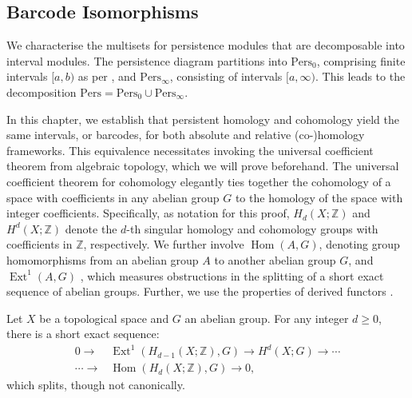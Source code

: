 \subsection{Barcode Isomorphisms}
\label{BarcodeIsomorphisms}
We characterise the multisets for persistence modules that are decomposable into
interval modules. The persistence diagram partitions into $\mathrm{Pers}_{0}$,
comprising finite intervals $[a, b)$ as per \cite[\S 2.3]{de2011dualities}, and $\mathrm{Pers}_{\infty}$, consisting of intervals $[a, \infty)$. This leads to the decomposition
$\mathrm{Pers}= \mathrm{Pers}_{0} \cup \mathrm{Pers}_{\infty}$.

In this chapter, we establish that persistent homology and cohomology yield the
same intervals, or barcodes, for both absolute and relative (co-)homology
frameworks. This equivalence necessitates invoking the universal coefficient theorem
from algebraic topology, which we will prove beforehand. The universal coefficient
theorem for cohomology elegantly ties together the cohomology of a space with coefficients
in any abelian group $G$ to the homology of the space with integer coefficients. Specifically, as notation for this proof, $H_{d}(X;\mathbb{Z})$ and
$H^{d}(X;\mathbb{Z})$ denote the $d$-th singular homology and cohomology groups
with coefficients in $\mathbb{Z}$, respectively. We further involve
$\operatorname{Hom}(A, G)$, denoting group homomorphisms from an abelian group $A$ to another
abelian group $G$, and $\operatorname{Ext}^{1}(A, G)$ \cite[\S 3.1, p.195]{hatcher2005algebraic}, which measures obstructions
in the splitting of a short exact sequence of abelian groups. Further, we use the
properties of derived functors \cite[\S 2.7]{Weibel1994}.

\begin{theorem}{\cite[Theorem 3.2]{hatcher2005algebraic}}
\label{UniversalCoefficientsforCohomology}
Let $X$ be a topological space and $G$ an abelian group. For any integer $d \geq 0$, there is a short exact sequence:
\begin{align}
0 \rightarrow &\operatorname{Ext}^{1}(H_{d-1}(X;\mathbb{Z}), G) \rightarrow H^{d}(X; G) \rightarrow \cdots \\
\cdots \rightarrow &\operatorname{Hom}(H_{d}(X;\mathbb{Z}), G) \rightarrow 0,
\end{align}
which splits, though not canonically.
\end{theorem}


